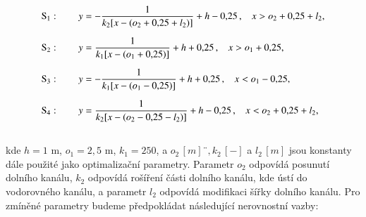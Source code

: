 \begin{align}\label{eq:hyperboly}
\begin{split}
\mathrm{S}_1 &: \hspace{7mm} y = -\frac{1}{k_2[x-(o_2 + 0{,}25 + l_2)]} + h - 0{,}25 \, , \hspace{3mm}x > o_2 + 0{,}25 + l_2,\\[6pt]
\mathrm{S}_2 &: \hspace{7mm} y = \frac{1}{k_1[x-(o_1 + 0{,}25)]} + h + 0{,}25 \, , \hspace{3mm}x > o_1 + 0{,}25,\\[6pt]
\mathrm{S}_3 &: \hspace{7mm} y = -\frac{1}{k_1[x-(o_1 - 0{,}25)]} + h + 0{,}25 \, , \hspace{3mm}x < o_1 - 0{,}25,\\[6pt]
\mathrm{S}_4 &: \hspace{7mm} y = \frac{1}{k_2[x-(o_2 - 0{,}25 - l_2)]} + h - 0{,}25 \, , \hspace{3mm}x < o_2 + 0{,}25 + l_2,\\[15pt]
\end{split}
\end{align}
kde $ h = 1$ m, $ o_1 = 2{,}5$ m, $ k_1 = 250$, a $ o_2 \, \si{[m]}¨, k_2 \, \si{[-]}$ a $ l_2 \, \si{[m]}$ jsou konstanty dále použité jako optimalizační parametry. Parametr $ o_2 $ odpovídá posunutí dolního kanálu, $ k_2 $ odpovídá rošíření části dolního kanálu, kde ústí do vodorovného kanálu, a parametr $ l_2 $ odpovídá modifikaci šířky dolního kanálu. Pro zmíněné parametry budeme předpokládat následující nerovnostní vazby:

